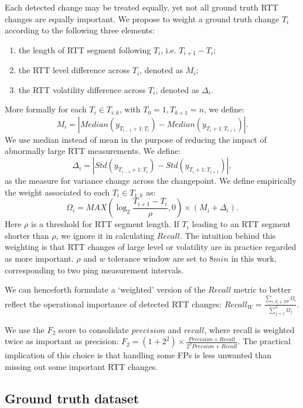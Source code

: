 Each detected change may be treated equally, yet not all ground truth RTT changes are equally important. 
We propose to weight a ground truth change $T_i$ according to the following three elements:
\begin{enumerate}
\item the length of RTT segment following $T_i$, i.e. $T_{i+1} - T_i$;
\item the RTT level difference across $T_i$, denoted as $M_i$; 
\item the RTT volatility difference across $T_i$, denoted as $\Delta_i$.
\end{enumerate}
More formally for each $T_i \in T_{i:k}$, with $T_0=1, T_{k+1} = n$, we define:
\begin{equation}
M_i = |Median(y_{T_{i-1}+1:T_i}) - Median(y_{T_i+1:T_{i+1}})|.
\end{equation}
We use median instead of mean in the purpose of reducing the impact of abnormally large RTT measurements.
We define:
\begin{equation}
\Delta_i = |Std(y_{T_{i-1}+1:T_i}) - Std(y_{T_i+1:T_{i+1}})|,
\end{equation}
as the measure for variance change across the changepoint.
We define empirically the weight associated to each $T_i \in T_{1:k}$ as:
\begin{equation}
\Omega_i = MAX(\log_2\frac{T_{i+1} - T_i}{\rho}, 0) \times (M_i + \Delta_i).
\end{equation}
Here $\rho$ is a threshold for RTT segment length. 
If $T_i$ leading to an RTT segment shorter than $\rho$, we ignore it in calculating $Recall$.
The intuition behind this weighting is that RTT changes of large level or volatility are in practice regarded as more important. $\rho$ and $w$ tolerance window are set to $8min$ in this work, corresponding to two ping measurement intervals. 

We can henceforth formulate a `weighted' version of the $Recall$ metric to better reflect the operational importance of detected RTT changes: $Recall_W = \frac{\sum_{i, T_i \in TP} \Omega_i}{\sum_{j=1}^k \Omega_j}.$

We use the $F_2$ score to consolidate $precision$ and $recall$, where recall is weighted twice as important as precision: $F_2 = (1+2^2) \times \frac{Precision \times Recall}{2^2Precsion + Recall}.$
The practical implication of this choice is that handling some FPs is less unwanted than missing out some important RTT changes.

\subsection{Ground truth dataset}
\label{sec:label}

